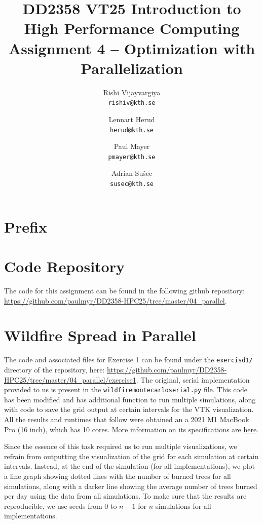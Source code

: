 \documentclass[a4paper,12pt]{article}
\title{
  \normalsize{DD2358 VT25 Introduction to}\\
  \normalsize{High Performance Computing}\\
  \large{Assignment 4 -- Optimization with Parallelization}\\
}
\author{
  \small Rishi Vijayvargiya\\[-0.75ex]
  \scriptsize\texttt{rishiv@kth.se}
  \and
  \small Lennart Herud\\[-0.75ex]
  \scriptsize\texttt{herud@kth.se}
  \and
  \small Paul Mayer\\[-0.75ex]
  \scriptsize\texttt{pmayer@kth.se}
  \and
  \small Adrian Sušec\\[-0.75ex]
  \scriptsize\texttt{susec@kth.se}
}
\date{}
\begin{document}
\maketitle
\thispagestyle{firstpagestyle}

\listoftodos

\vspace{1em}

%
\section*{Prefix}

%

\section{Code Repository}
The code for this assignment can be found in the following github repository: \url{https://github.com/paulmyr/DD2358-HPC25/tree/master/04_parallel}.

\section{Wildfire Spread in Parallel}
The code and associated files for Exercise 1 can be found under the \verb|exercisd1/| directory of the repository, here: \url{https://github.com/paulmyr/DD2358-HPC25/tree/master/04_parallel/exercise1}. The original, serial implementation provided to us is present in the \verb|wildfiremontecarloserial.py| file. This code has been modified and has additional function to run multiple simulations, along with code to save the grid output at certain intervals for the VTK visualization. All the results and runtimes that follow were obtained an a 2021 M1 MacBook Pro (16 inch), which has 10 cores. More information on its specifications are \href{https://support.apple.com/en-us/111901}{here}.

Since the essence of this task required us to run multiple visualizations, we refrain from outputting the visualization of the grid for each simulation at certain intervals. Instead, at the end of the simulation (for all implementations), we plot a line graph showing dotted lines with the number of burned trees for all simulations, along with a darker line showing the average number of trees burned per day using the data from all simulations. To make sure that the results are reproducible, we use seeds from 0 to $n-1$ for $n$ simulations for all implementations. 
\end{document}
